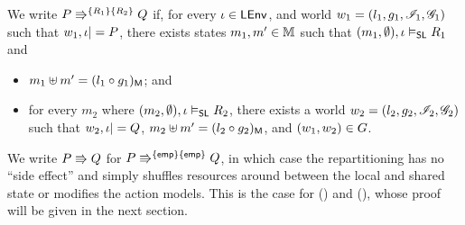 \begin{definition}[Repartitioning] \label{def:repartitioning}
  We write $\repartitions{P}{Q}{R_1}{R_2}$ if, for every $\lenv \in
  \LEnv$, and world $w_1 = (l_1,g_1,\lmod_1,\gmod_1)$ such that $w_1,
  \lenv |= P$, there exists states $m_1,m' \in \Heaps$ such that
  $(m_1, \emptyset), \lenv \slsat R_1$ and
\begin{itemize} 
\item $m_1 \composeH m' = \heapPart{(l_1\composeL g_1)}$; and
\item for every $m_2$ where $(m_2, \emptyset), \lenv \slsat R_2$,
  there exists a world $w_2 = (l_2,g_2,\lmod_2,\gmod_2)$ such that
  $w_2, \lenv |= Q$,
  $m_2 \composeH m' = \heapPart{(l_2 \composeL g_2)}$, and
  $(w_1, w_2) \in \guarantee$.
\end{itemize}
\end{definition}

We write $P \semimplies Q$ for $\repartitions{P}{Q}{\emp}{\emp} $, in
which case the repartitioning has no ``side effect'' and simply
shuffles resources around between the local and shared state or
modifies the action models. This is the case for (\shiftRule) and
(\extendRule), whose proof will be given in the next section.

%	
%
%

